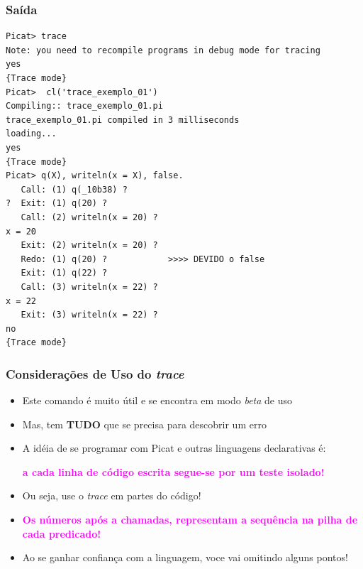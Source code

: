 
\begin{frame}[fragile]

\frametitle{Saída}

\begin{scriptsize}
\begin{verbatim}
Picat> trace
Note: you need to recompile programs in debug mode for tracing
yes
{Trace mode}
Picat>  cl('trace_exemplo_01')
Compiling:: trace_exemplo_01.pi
trace_exemplo_01.pi compiled in 3 milliseconds
loading...
yes
{Trace mode}
Picat> q(X), writeln(x = X), false.
   Call: (1) q(_10b38) ?
?  Exit: (1) q(20) ?
   Call: (2) writeln(x = 20) ?
x = 20
   Exit: (2) writeln(x = 20) ?
   Redo: (1) q(20) ?            >>>> DEVIDO o false
   Exit: (1) q(22) ?
   Call: (3) writeln(x = 22) ?
x = 22
   Exit: (3) writeln(x = 22) ?
no
{Trace mode}
\end{verbatim}
\end{scriptsize}
\end{frame}


\begin{frame}[fragile]

\frametitle{Considerações de Uso do \textit{trace}}

\begin{itemize}
  \item Este comando é muito útil e se encontra em modo \textit{beta} de uso
  
  \item Mas, tem \textbf{TUDO} que se precisa para descobrir um erro
  
  \pause
  \item A idéia de se programar com Picat e outras linguagens
  declarativas é: 

  \pause
  \textcolor{magenta}{\textbf{a cada linha de código escrita segue-se por um teste isolado!}}

  \pause
  \item Ou seja,  use o \textit{trace} em partes do código!

    \pause
    \item   \textcolor{magenta}{\textbf{Os números após a chamadas, representam a sequência na pilha de cada predicado!}} 

  \pause
  \item Ao se ganhar confiança com a linguagem, voce vai omitindo alguns pontos!

  
\end{itemize}

\end{frame}


